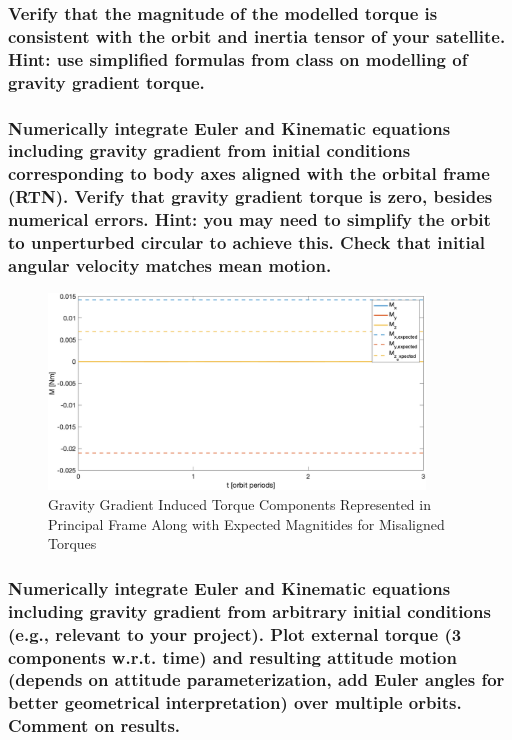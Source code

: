 \subsubsection{Verify that the magnitude of the modelled torque is consistent with the orbit and inertia tensor of
your satellite. Hint: use simplified formulas from class on modelling of gravity gradient torque.}

\subsubsection{Numerically integrate Euler and Kinematic equations including gravity gradient from initial
conditions corresponding to body axes aligned with the orbital frame (RTN). Verify that gravity
gradient torque is zero, besides numerical errors. Hint: you may need to simplify the orbit to
unperturbed circular to achieve this. Check that initial angular velocity matches mean motion.}

\begin{figure}[H]
    \centering
    \captionsetup{ justification = centering}
    \includegraphics[width = 10cm]{Images/PS4/gravity_torque_RTN_aligned.png}
    \caption{Gravity Gradient Induced Torque Components Represented in Principal Frame Along with Expected Magnitides for Misaligned Torques}
    \label{fig:gravity_gradienet_RTN_aligned}
\end{figure}

\subsubsection{Numerically integrate Euler and Kinematic equations including gravity gradient from arbitrary
initial conditions (e.g., relevant to your project). Plot external torque (3 components w.r.t. time)
and resulting attitude motion (depends on attitude parameterization, add Euler angles for better
geometrical interpretation) over multiple orbits. Comment on results.}


